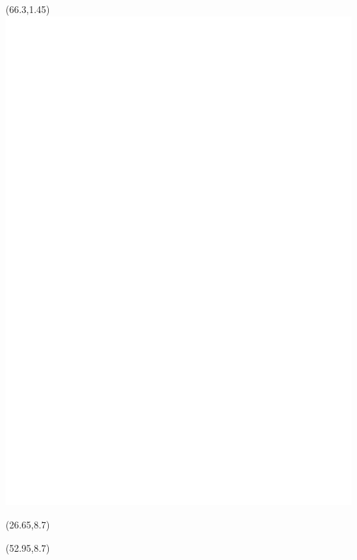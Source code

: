 \documentclass[final,hyperref={pdfpagelabels=false}]{beamer}
\begin{document}
\begin{textblock}{14}(66.3,1.45)
\includegraphics[trim=0 0 0 0,clip,scale=.8]{./img/EDFLAB_LOGO_blanc}
\end{textblock}

\begin{textblock}{0.1}(26.65,8.7)
\vrule width 1pt height 86cm
\end{textblock}

\begin{textblock}{0.1}(52.95,8.7)
\vrule width 1pt height 86cm
\end{textblock}
\end{document}
